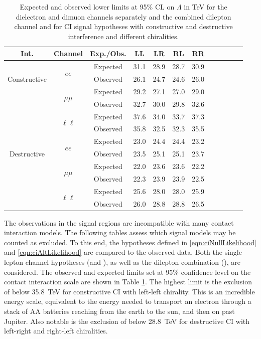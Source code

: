 \begin{table}[h!]
\begin{center}
\caption{Expected and observed lower limits at 95$\%$ CL on $\Lambda$ in TeV for the dielectron and dimuon channels separately and the combined dilepton channel and for CI signal hypotheses with constructive and destructive interference and different chiralities.}
{\begin{tabular}{c c c c c c c c c c c c}\toprule
Int. & Channel & Exp./Obs. & LL & LR & RL & RR \\
\midrule
\multirow{3}{*}[-1.5em]{\begin{sideways}Constructive\end{sideways}} & \multirow{2}{*}{$ee$} & Expected & 31.1 & 28.9 & 28.7 & 30.9 \\
& & Observed & 26.1 & 24.7 & 24.6 & 26.0 \\
\cmidrule{2-7}
 & \multirow{2}{*}{$\mu\mu$} & Expected & 29.2 & 27.1 & 27.0 & 29.0 \\
& & Observed & 32.7 & 30.0 & 29.8 & 32.6 \\
\cmidrule{2-7}
 & \multirow{2}{*}{$\ell\ell$} & Expected & 37.6 & 34.0 & 33.7 & 37.3 \\
& & Observed & 35.8 & 32.5 & 32.3 & 35.5 \\
\midrule
\multirow{3}{*}[-1.5em]{\begin{sideways}Destructive\end{sideways}} & \multirow{2}{*}{$ee$} & Expected & 23.0 & 24.4 & 24.4 & 23.2 \\
& & Observed & 23.5 & 25.1 & 25.1 & 23.7 \\
\cmidrule{2-7}
 & \multirow{2}{*}{$\mu\mu$} & Expected & 22.0 & 23.6 & 23.6 & 22.2 \\
& & Observed & 22.3 & 23.9 & 23.9 & 22.5 \\
\cmidrule{2-7}
 & \multirow{2}{*}{$\ell\ell$} & Expected & 25.6 & 28.0 & 28.0 & 25.9 \\
& & Observed & 26.0 & 28.8 & 28.8 & 26.5 \\
\bottomrule\end{tabular}}
\label{tab:lambdaLimits1}
\end{center}
\end{table}

The observations in the signal regions are incompatible with many contact interaction models.
The following tables assess which signal models may be counted as excluded.
To this end, the hypotheses defined in \ref{eqn:ciNullLikelihood} and \ref{eqn:ciAltLikelihood} are compared to the observed data.
Both the single lepton channel hypotheses (\ee and \mm), as well as the dilepton combination (\ll), are considered.
The observed and expected limits set at 95\% confidence level on the contact interaction scale \lam are shown in Table \ref{tab:lambdaLimits1}.
The highest limit is the exclusion of \lam below 35.8~TeV for \ll constructive CI with left-left chirality.
This is an incredible energy scale, equivalent to the energy needed to transport an electron through a stack of AA batteries reaching from the earth to the sun, and then on past Jupiter.
Also notable is the exclusion of \lam below 28.8~TeV for \ll destructive CI with left-right and right-left chiralities.


